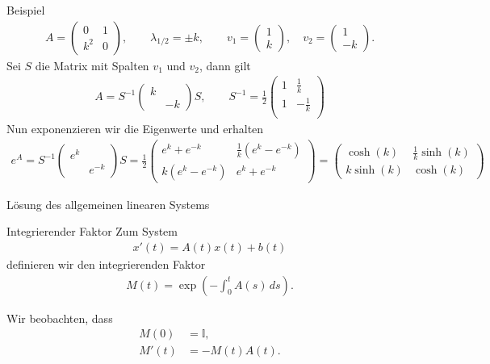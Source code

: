 \begin{frame}{Beispiel}
  \begin{gather*}
    A =
    \begin{pmatrix}
      0 & 1\\k^2 & 0
    \end{pmatrix},
    \qquad \lambda_{1/2} = \pm k,
    \qquad v_1 =
    \begin{pmatrix}
      1\\k
    \end{pmatrix},
    \quad
    v_2 =
    \begin{pmatrix}
      1 \\ -k
    \end{pmatrix}.
  \end{gather*}
  \pause
  Sei $S$ die Matrix mit Spalten $v_1$ und $v_2$, dann gilt
  \begin{gather*}
    A = S^{-1}
    \begin{pmatrix}
      k \\ &-k
    \end{pmatrix}
    S,
    \qquad
    S^{-1} =
    \frac12
    \begin{pmatrix}
      1 & \tfrac1k\\
      1 & -\tfrac1k\\
    \end{pmatrix}
  \end{gather*}
  \pause
  Nun exponenzieren wir die Eigenwerte und erhalten
  \begin{gather*}
    e^A =  S^{-1}
    \begin{pmatrix}
      e^k \\ &e^{-k}
    \end{pmatrix}
    S
    = \frac12
    \begin{pmatrix}
      e^k + e^{-k} & \tfrac 1k (e^k - e^{-k}) \\
      k (e^k - e^{-k}) & e^k + e^{-k}
    \end{pmatrix}
    =
    \begin{pmatrix}
      \cosh(k) & \tfrac 1k \sinh(k) \\
      k \sinh(k) & \cosh(k)
    \end{pmatrix}
  \end{gather*}
  \vspace*{.9\textheight}
\end{frame}

\begin{frame}{Lösung des allgemeinen linearen Systems}
  \begin{block}{Integrierender Faktor}
    Zum System
    \begin{gather*}
      x'(t) = A(t) x(t) + b(t)
    \end{gather*}
    definieren wir den integrierenden Faktor
    \begin{gather*}
      M(t) = \exp\left(-\int_0^t A(s) \,ds\right).
    \end{gather*}
  \end{block}
  Wir beobachten, dass
  \begin{align*}
    M(0) &= \mathbb I,\\
    M'(t) &= -M(t) A(t).
  \end{align*}
\end{frame}

